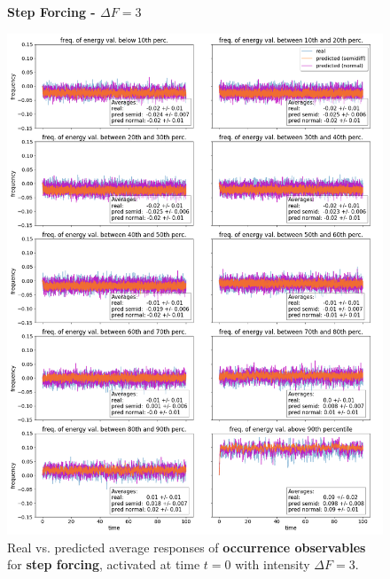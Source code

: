 \documentclass{article}
\begin{document}
\begin{figure}[!htb]
	\centering
	\textbf{Step Forcing - $\Delta F=3$}\par\medskip
	\includegraphics[width=0.9\linewidth]{fig/pred_bin_S_30.png}
	\caption{Real vs. predicted average responses of \textbf{occurrence observables} for \textbf{step forcing}, activated at time $t=0$ with intensity $\Delta F = 3$.}
	\label{fig:pred_bin_S_30}
\end{figure}
\end{document}
